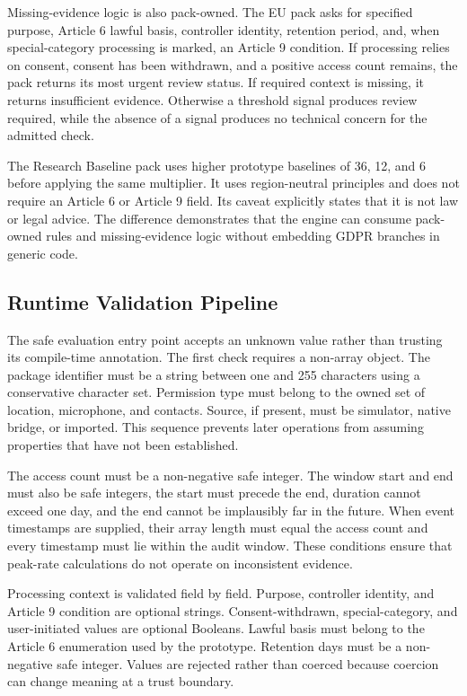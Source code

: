 Missing-evidence logic is also pack-owned. The EU pack asks for specified purpose, Article 6 lawful basis, controller identity, retention period, and, when special-category processing is marked, an Article 9 condition. If processing relies on consent, consent has been withdrawn, and a positive access count remains, the pack returns its most urgent review status. If required context is missing, it returns insufficient evidence. Otherwise a threshold signal produces review required, while the absence of a signal produces no technical concern for the admitted check.

The Research Baseline pack uses higher prototype baselines of 36, 12, and 6 before applying the same multiplier. It uses region-neutral principles and does not require an Article 6 or Article 9 field. Its caveat explicitly states that it is not law or legal advice. The difference demonstrates that the engine can consume pack-owned rules and missing-evidence logic without embedding GDPR branches in generic code.

\subsection{Runtime Validation Pipeline}

The safe evaluation entry point accepts an unknown value rather than trusting its compile-time annotation. The first check requires a non-array object. The package identifier must be a string between one and 255 characters using a conservative character set. Permission type must belong to the owned set of location, microphone, and contacts. Source, if present, must be simulator, native bridge, or imported. This sequence prevents later operations from assuming properties that have not been established.

The access count must be a non-negative safe integer. The window start and end must also be safe integers, the start must precede the end, duration cannot exceed one day, and the end cannot be implausibly far in the future. When event timestamps are supplied, their array length must equal the access count and every timestamp must lie within the audit window. These conditions ensure that peak-rate calculations do not operate on inconsistent evidence.

Processing context is validated field by field. Purpose, controller identity, and Article 9 condition are optional strings. Consent-withdrawn, special-category, and user-initiated values are optional Booleans. Lawful basis must belong to the Article 6 enumeration used by the prototype. Retention days must be a non-negative safe integer. Values are rejected rather than coerced because coercion can change meaning at a trust boundary.

